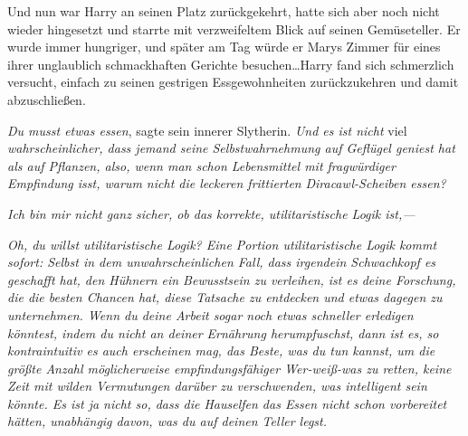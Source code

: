 Und nun war Harry an seinen Platz zurückgekehrt, hatte sich aber noch nicht wieder hingesetzt und starrte mit verzweifeltem Blick auf seinen Gemüseteller. Er wurde immer hungriger, und später am Tag würde er Marys Zimmer für eines ihrer unglaublich schmackhaften Gerichte besuchen…Harry fand sich schmerzlich versucht, einfach zu seinen gestrigen Essgewohnheiten zurückzukehren und damit abzuschließen.

\emph{Du musst etwas essen}, sagte sein innerer Slytherin. \emph{Und es ist nicht} viel \emph{wahrscheinlicher, dass jemand seine Selbstwahrnehmung auf Geflügel geniest hat als auf Pflanzen, also, wenn man schon Lebensmittel mit fragwürdiger Empfindung isst, warum nicht die leckeren frittierten} \emph{Diracawl-Scheiben essen?}

\emph{Ich bin mir nicht ganz sicher, ob das korrekte, utilitaristische Logik ist,—}

\emph{Oh, du willst utilitaristische Logik? Eine Portion utilitaristische Logik kommt sofort: Selbst in dem unwahrscheinlichen Fall, dass irgendein Schwachkopf es geschafft hat, den Hühnern ein Bewusstsein zu verleihen, ist es deine Forschung, die die besten Chancen hat, diese Tatsache zu entdecken und etwas dagegen zu unternehmen. Wenn du deine Arbeit sogar noch etwas schneller erledigen könntest, indem du \emph{nicht} an deiner Ernährung herumpfuschst, dann ist es, so kontraintuitiv es auch erscheinen mag, das Beste, was du tun kannst, um die größte Anzahl möglicherweise empfindungsfähiger Wer-weiß-was zu retten, keine Zeit mit wilden Vermutungen darüber zu verschwenden, was intelligent sein könnte. Es ist ja nicht so, dass die Hauselfen das Essen nicht schon vorbereitet hätten, unabhängig davon, was du auf deinen Teller legst.}

